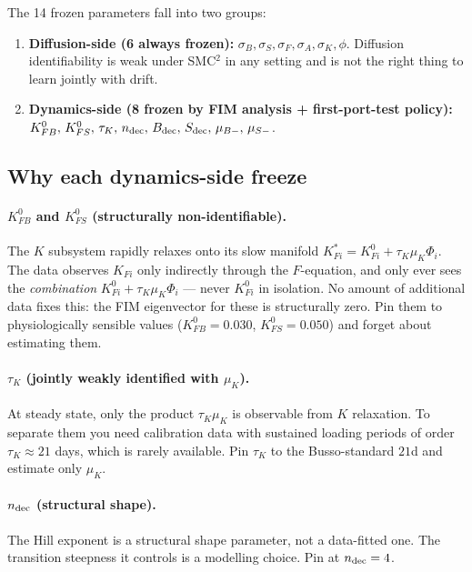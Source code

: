 \documentclass[11pt,a4paper]{article}
\theoremstyle{definition}
\begin{document}
The 14 frozen parameters fall into two groups:

\begin{enumerate}
  \item \textbf{Diffusion-side (6 always frozen):}
        $\sigma_B, \sigma_S, \sigma_F, \sigma_A, \sigma_K, \phi$.
        Diffusion identifiability is weak under SMC$^2$ in any setting
        and is not the right thing to learn jointly with drift.
  \item \textbf{Dynamics-side (8 frozen by FIM analysis + first-port-test policy):}
        $K_{FB}^0,\, K_{FS}^0,\, \tau_K,\, n_{\rm dec},\, B_{\rm dec},\,
        S_{\rm dec},\, \mu_{B-},\, \mu_{S-}$.
\end{enumerate}

\subsection{Why each dynamics-side freeze}

\paragraph{$K_{FB}^0$ and $K_{FS}^0$ (structurally non-identifiable).}
The $K$ subsystem rapidly relaxes onto its slow manifold $K_{Fi}^* =
K_{Fi}^0 + \tau_K \mu_K \Phi_i$. The data observes $K_{Fi}$ only
indirectly through the $F$-equation, and only ever sees the
\emph{combination} $K_{Fi}^0 + \tau_K \mu_K \Phi_i$ --- never $K_{Fi}^0$
in isolation. No amount of additional data fixes this: the FIM
eigenvector for these is structurally zero. Pin them to physiologically
sensible values ($K_{FB}^0 = 0.030$, $K_{FS}^0 = 0.050$) and forget
about estimating them.

\paragraph{$\tau_K$ (jointly weakly identified with $\mu_K$).}
At steady state, only the product $\tau_K \mu_K$ is observable from $K$
relaxation. To separate them you need calibration data with sustained
loading periods of order $\tau_K \approx 21$ days, which is rarely
available. Pin $\tau_K$ to the Busso-standard $21$d and estimate only
$\mu_K$.

\paragraph{$n_{\rm dec}$ (structural shape).}
The Hill exponent is a structural shape parameter, not a data-fitted
one. The transition steepness it controls is a modelling choice. Pin
at $n_{\rm dec} = 4$.
\end{document}
